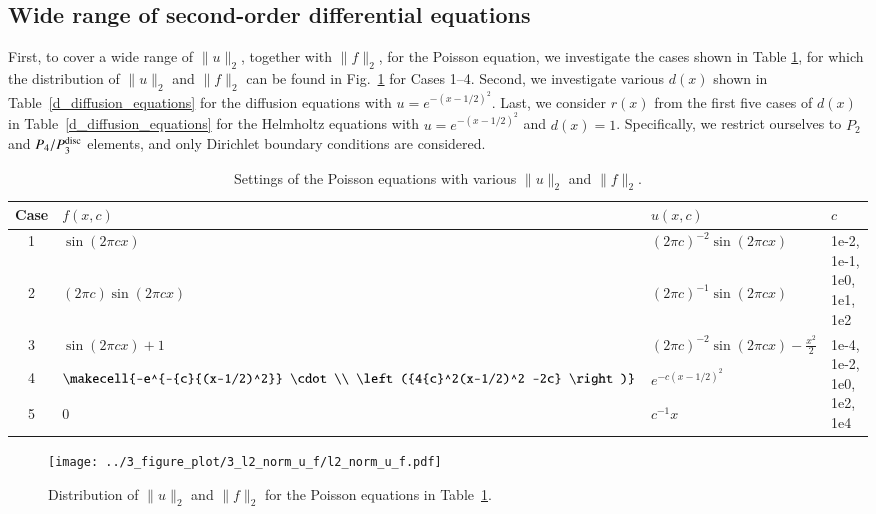 \documentclass[review,3p]{elsarticle}
\begin{document}
\subsection{Wide range of second-order differential equations}	    \label{section_scaling}

First, to cover a wide range of $\|u\|_2$, together with $\|f\|_2$, for the Poisson equation, we investigate the cases shown in Table \ref{scaling_cases_Poisson}, for which the distribution of $\|u\|_2$ and $\|f\|_2$ can be found in Fig.~\ref{l2_norm_u_f} for Cases 1--4. Second, we investigate various $d(x)$ shown in Table~\ref{d_diffusion_equations} for the diffusion equations with $u=e^{-{(x-1/2)^2}}$. Last, we consider $r(x)$ from the first five cases of $d(x)$ in Table~\ref{d_diffusion_equations} for the Helmholtz equations with $u=e^{-{(x-1/2)^2}}$ and $d(x)=1$. Specifically, we restrict ourselves to $P_2$ and $P_4/P_3^{\rm disc}$ elements, and only Dirichlet boundary conditions are considered. 

\begin{table}[!ht]
\centering
\caption [w]{Settings of the Poisson equations with various $\|u\|_2$ and $\|f\|_2$.} 
\label{scaling_cases_Poisson}
 \begin{tabular}{c l l l} \hline      
Case & $f(x,c)$ & $u(x,c)$ & $c$ \\ \hline
1 & $\sin (2 \pi cx)$ & ${(2 \pi c)}^{-2} \sin (2 \pi cx)$ & \multirow{2}{*}{1e-2, 1e-1, 1e0, 1e1, 1e2} \\ \cline{1-3}
2 & $(2 \pi c) \sin (2 \pi c x)$ & ${(2 \pi c)}^{-1} \sin (2 \pi cx)$ &  \\ \hline
3 & $\sin (2 \pi c x) +1$ & ${(2 \pi c)}^{-2}\sin (2 \pi c x)-\frac{x^2}{2}$ & \multirow{4}{*}{1e-4, 1e-2, 1e0, 1e2, 1e4} \\ \cline{1-3}
4 & $\makecell{-e^{-{c}{(x-1/2)^2}} \cdot \\ \left({4{c}^2(x-1/2)^2 -2c} \right)}$ & $e^{-{c}{{(x-1/2)^2}}}$ &  \\ \cline{1-3}
5 & $0$ & ${c}^{-1} x$ &  \\ \hline
\end{tabular}
\end{table}

\begin{figure}[!ht]
\centering
    \texttt{[image: ../3\_figure\_plot/3\_l2\_norm\_u\_f/l2\_norm\_u\_f.pdf]}
    \caption{Distribution of $\|u\|_2$ and $\|f\|_2$ for the Poisson equations in Table~\ref{scaling_cases_Poisson}.}
    \label{l2_norm_u_f}
\end{figure}
\end{document}
